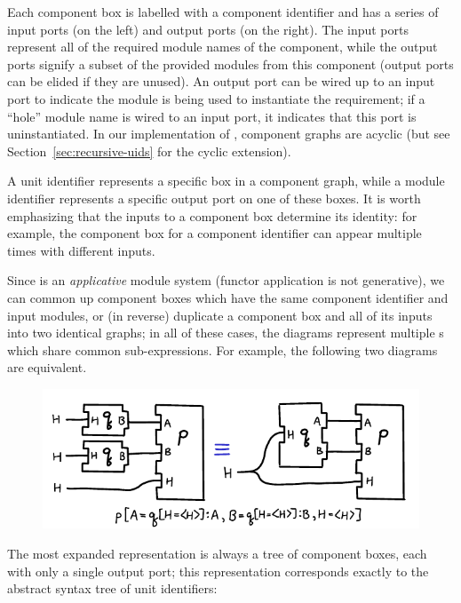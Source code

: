 \noindent
Each component box is labelled with a component identifier and has a
series of input ports (on the left) and output ports (on the right). The
input ports represent all of the required module names of the component,
while the output ports signify a subset of the provided modules from
this component (output ports can be elided if they are unused). An
output port can be wired up to an input port to indicate the module is
being used to instantiate the requirement; if a ``hole'' module name is
wired to an input port, it indicates that this port is uninstantiated.
In our implementation of \Backpack{}, component graphs are acyclic
(but see Section~\ref{sec:recursive-uids} for the cyclic extension).

A unit identifier represents a specific box in a component graph, while
a module identifier represents a specific output port on one of these
boxes. It is worth emphasizing that the inputs to a component box
determine its identity: for example, the component box for a component
identifier can appear multiple times with different inputs.

Since \Backpack{} is an \emph{applicative} module system (functor
application is not generative), we can common up component boxes which
have the same component identifier and input modules, or (in reverse)
duplicate a component box and all of its inputs into two identical
graphs; in all of these cases, the diagrams represent multiple \uid{}s
which share common sub-expressions.  For example, the following
two diagrams are equivalent.

\begin{figure}[H]
\center\includegraphics{figures/unit-identifier-pictorial-equivalence-example-2.pdf}
\end{figure}

The most expanded representation is always a tree of component boxes, each
with only a single output port; this representation corresponds exactly
to the abstract syntax tree of unit identifiers:


